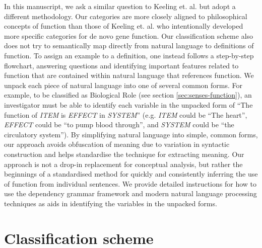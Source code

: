 \documentclass{article}
\begin{document}
In this manuscript, we ask a similar question to Keeling et. al. \cite{keeling2019} but adopt a different methodology.
Our categories are more closely aligned to philosophical concepts of function than those of Keeling et. al. \cite{keeling2019} who intentionally developed more specific categories for de novo gene function.
Our classification scheme also does not try to semantically map directly from natural language to definitions of function.
To assign an example to a definition, one instead follows a step-by-step flowchart, answering questions and identifying important features related to function that are contained within natural language that references function.
We unpack each piece of natural language into one of several common forms.
For example, to be classified as Biological Role (see section \ref{sec:senses-function}), an investigator must be able to identify each variable in the unpacked form of ``The function of \emph{ITEM} is \emph{EFFECT} in \emph{SYSTEM}'' (e.g. \emph{ITEM} could be ``The heart'', \emph{EFFECT} could be ``to pump blood through'', and \emph{SYSTEM} could be ``the circulatory system'').
By simplifying natural language into simple, common forms, our approach avoids obfuscation of meaning due to variation in syntactic construction and helps standardise the technique for extracting meaning.
Our approach is not a drop-in replacement for conceptual analysis, but rather the beginnings of a standardised method for quickly and consistently inferring the use of function from individual sentences.
We provide detailed instructions for how to use the dependency grammar framework and modern natural language processing techniques as aids in identifying the variables in the unpacked forms.


\section{Classification scheme}
\label{sec:class-scheme}
\end{document}
